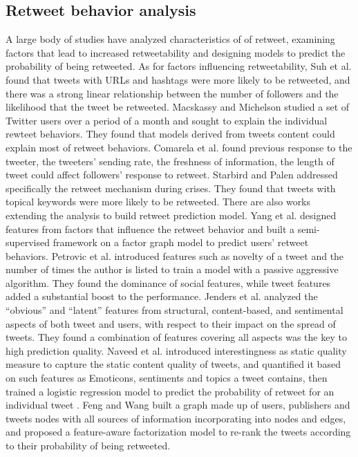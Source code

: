 \documentclass[preprint,times]{elsarticle}
\begin{document}
\subsection{Retweet behavior analysis}
A large body of studies have analyzed characteristics of of retweet, examining factors that lead to increased retweetability and designing models to predict the probability of being retweeted. 
As for factors influencing retweetability, Suh et al.\cite{Suh2010} found that tweets with URLs and hashtags were more likely to be retweeted, and there was a strong linear relationship between the number of followers and the likelihood that the tweet be retweeted. 
Macskassy and Michelson\cite{conf/icwsm/MacskassyM11} studied a set of Twitter users over a period of a month and sought to explain the individual rewteet behaviors.
They found that models derived from tweets content could explain most of retweet behaviors.
Comarela et al.\cite{Comarela:2012UFA} found previous response to the tweeter, the tweeters’ sending rate, the freshness of information, the length of tweet could affect followers’ response to retweet. Starbird and Palen\cite{Starbird:2012RRI} addressed specifically the retweet mechanism during crises. 
They found that tweets with topical keywords were more likely to be retweeted. 
There are also works extending the analysis to build retweet prediction model. 
Yang et al.\cite{conf/cikm/YangGCTLZS10} designed features from factors that influence the retweet behavior and built a semi-supervised framework on a factor graph model to predict users’ retweet behaviors. 
Petrovic et al.\cite{Osborne_Lavrenko_2011} introduced features such as novelty of a tweet and the number of times the author is listed to train a model with a passive aggressive algorithm. 
They found the dominance of social features, while tweet features added a substantial boost to the performance.
Jenders et al.\cite{Jenders:2013APV} analyzed the “obvious” and “latent” features from structural, content-based, and sentimental aspects of both tweet and users, with respect to their impact on the spread of tweets. 
They found a combination of features covering all aspects was the key to high prediction quality.
Naveed et al.\cite{Naveed:2011SMC,2011:NaveedGKC} introduced interestingness as static quality measure to capture the static content quality of tweets, and quantified it based on such features as Emoticons, sentiments and topics a tweet contains, then trained a logistic regression model to predict the probability of retweet for an individual tweet .
Feng and Wang\cite{conf/wsdm/FengW13} built a graph made up of users, publishers and tweets nodes with all sources of information incorporating into nodes and edges, and proposed a feature-aware factorization model to re-rank the tweets according to their probability of being retweeted.
\end{document}
